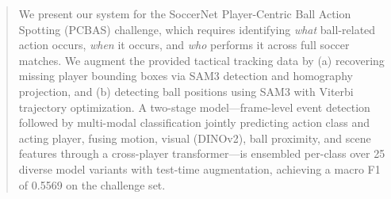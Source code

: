 \begin{abstract}
We present our system for the SoccerNet Player-Centric Ball Action Spotting (PCBAS) challenge, which requires identifying \emph{what} ball-related action occurs, \emph{when} it occurs, and \emph{who} performs it across full soccer matches. We augment the provided tactical tracking data by (a) recovering missing player bounding boxes via SAM3 detection and homography projection, and (b) detecting ball positions using SAM3 with Viterbi trajectory optimization. A two-stage model---frame-level event detection followed by multi-modal classification jointly predicting action class and acting player, fusing motion, visual (DINOv2), ball proximity, and scene features through a cross-player transformer---is ensembled per-class over 25 diverse model variants with test-time augmentation, achieving a macro F1 of 0.5569 on the challenge set.
\end{abstract}
